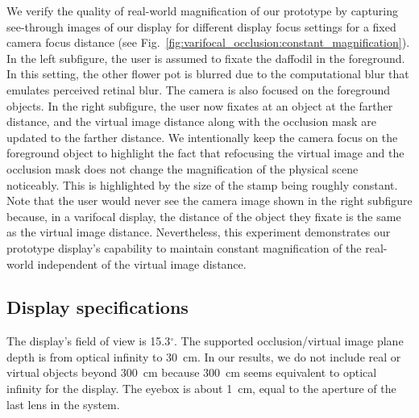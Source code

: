 We verify the quality of real-world magnification of our prototype by capturing see-through images of our display for different display focus settings for a fixed camera focus distance (see Fig.~\ref{fig:varifocal_occlusion:constant_magnification}). In the left subfigure, the user is assumed to fixate the daffodil in the foreground. In this setting, the other flower pot is blurred due to the computational blur that emulates perceived retinal blur. The camera is also focused on the foreground objects. In the right subfigure, the user now fixates at an object at the farther distance, and the virtual image distance along with the occlusion mask are updated to the farther distance. We intentionally keep the camera focus on the foreground object to highlight the fact that refocusing the virtual image and the occlusion mask does not change the magnification of the physical scene noticeably. This is highlighted by the size of the stamp being roughly constant. Note that the user would never see the camera image shown in the right subfigure because, in a varifocal display, the distance of the object they fixate is the same as the virtual image distance. Nevertheless, this experiment demonstrates our prototype display's capability to maintain constant magnification of the real-world independent of the virtual image distance.



\subsection{Display specifications}
The display's field of view is 15.3$^\circ$. The supported occlusion/virtual image plane depth is from optical infinity to 30~cm. In our results, we do not include real or virtual objects beyond 300~cm because 300~cm seems equivalent to optical infinity for the display. The eyebox is about 1~cm, equal to the aperture of the last lens in the system. 
